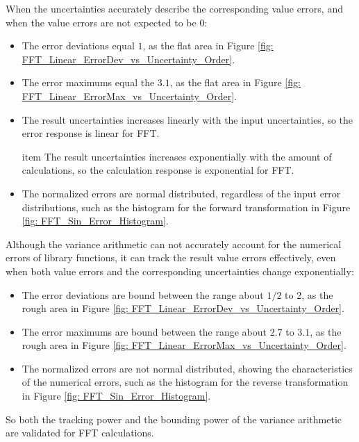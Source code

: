 \documentclass[twoside]{article}
\numberwithin{equation}{section}
\begin{document}
When the uncertainties accurately describe the corresponding value errors, and when the value errors are not expected to be $0$:
\begin{itemize}
\item The error deviations equal $1$, as the flat area in Figure \ref{fig: FFT_Linear_ErrorDev_vs_Uncertainty_Order}.

\item The error maximums equal the $3.1$, as the flat area in Figure \ref{fig: FFT_Linear_ErrorMax_vs_Uncertainty_Order}.

\item The result uncertainties increases linearly with the input uncertainties, so the error response is linear for FFT.

item The result uncertainties increases exponentially with the amount of calculations, so the calculation response is exponential for FFT.

\item The normalized errors are normal distributed, regardless of the input error distributions, such as the histogram for the forward transformation in Figure \ref{fig: FFT_Sin_Error_Histogram}.
\end{itemize}
Although the variance arithmetic can not accurately account for the numerical errors of library functions, it can track the result value errors effectively, even when both value errors and the corresponding uncertainties change exponentially:
\begin{itemize}
\item The error deviations are bound between the range about $1/2$ to $2$, as the rough area in Figure \ref{fig: FFT_Linear_ErrorDev_vs_Uncertainty_Order}.

\item The error maximums are bound between the range about $2.7$ to $3.1$, as the rough area in Figure \ref{fig: FFT_Linear_ErrorMax_vs_Uncertainty_Order}.

\item The normalized errors are not normal distributed, showing the characteristics of the numerical errors, such as the histogram for the reverse transformation in Figure \ref{fig: FFT_Sin_Error_Histogram}.
\end{itemize}
So both the tracking power and the bounding power of the variance arithmetic are validated for FFT calculations.
\end{document}
